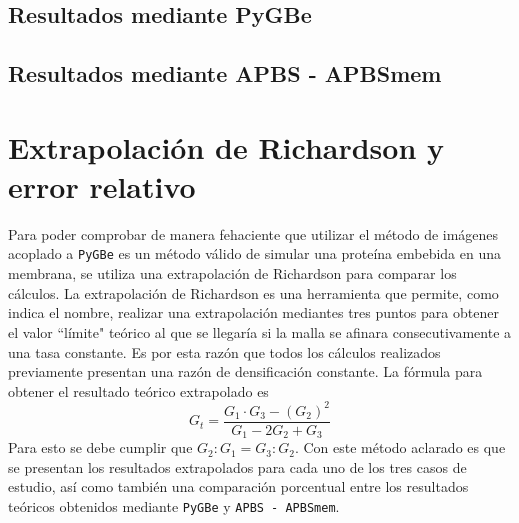\documentclass[12pt, oneside, numbers, spanish]{ezthesis}
\numberwithin{equation}{section}
\begin{document}
\subsection{Resultados mediante PyGBe}



\subsection{Resultados mediante APBS - APBSmem}



\section{Extrapolación de Richardson y error relativo}
Para poder comprobar de manera fehaciente que utilizar el método de imágenes acoplado a \texttt{PyGBe} es un método válido de simular una proteína embebida en una membrana, se utiliza una extrapolación de Richardson para comparar los cálculos. La extrapolación de Richardson es una herramienta que permite, como indica el nombre, realizar una extrapolación mediantes tres puntos para obtener el valor ``límite" teórico al que se llegaría si la malla se afinara consecutivamente a una tasa constante. Es por esta razón que todos los cálculos realizados previamente presentan una razón de densificación constante. La fórmula para obtener el resultado teórico extrapolado es
\begin{equation}
G_t = \frac{G_1\cdot G_3 - (G_2)^2}{G_1 - 2G_2 + G_3}
\end{equation}
Para esto se debe cumplir que $G_2:G_1 = G_3:G_2$. Con este método aclarado es que se presentan los resultados extrapolados para cada uno de los tres casos de estudio, así como también una comparación porcentual entre los resultados teóricos obtenidos mediante \texttt{PyGBe} y \texttt{APBS - APBSmem}.
\end{document}
